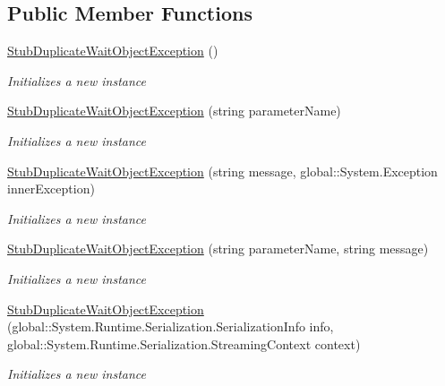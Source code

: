 \subsection*{Public Member Functions}
\begin{DoxyCompactItemize}
\item 
\hyperlink{class_system_1_1_fakes_1_1_stub_duplicate_wait_object_exception_a05ac4e348b52211d9d31b86ef21f6f32}{Stub\-Duplicate\-Wait\-Object\-Exception} ()
\begin{DoxyCompactList}\small\item\em Initializes a new instance\end{DoxyCompactList}\item 
\hyperlink{class_system_1_1_fakes_1_1_stub_duplicate_wait_object_exception_ab633c95f28d6207915627c031f0cdb3c}{Stub\-Duplicate\-Wait\-Object\-Exception} (string parameter\-Name)
\begin{DoxyCompactList}\small\item\em Initializes a new instance\end{DoxyCompactList}\item 
\hyperlink{class_system_1_1_fakes_1_1_stub_duplicate_wait_object_exception_a65f9037fe4a3004bce7acc0227b454be}{Stub\-Duplicate\-Wait\-Object\-Exception} (string message, global\-::\-System.\-Exception inner\-Exception)
\begin{DoxyCompactList}\small\item\em Initializes a new instance\end{DoxyCompactList}\item 
\hyperlink{class_system_1_1_fakes_1_1_stub_duplicate_wait_object_exception_affd1b69f4235ea471161d719ceb26ce0}{Stub\-Duplicate\-Wait\-Object\-Exception} (string parameter\-Name, string message)
\begin{DoxyCompactList}\small\item\em Initializes a new instance\end{DoxyCompactList}\item 
\hyperlink{class_system_1_1_fakes_1_1_stub_duplicate_wait_object_exception_abcdfa727ed5c18e0db6d1fbc87b4a792}{Stub\-Duplicate\-Wait\-Object\-Exception} (global\-::\-System.\-Runtime.\-Serialization.\-Serialization\-Info info, global\-::\-System.\-Runtime.\-Serialization.\-Streaming\-Context context)
\begin{DoxyCompactList}\small\item\em Initializes a new instance\end{DoxyCompactList}\item 

\end{DoxyCompactItemize}
